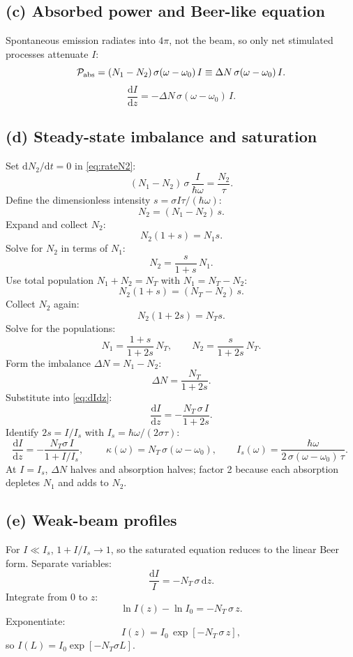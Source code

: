 \documentclass[11pt]{article}
\newcommand{\de}{\mathrm{d}}
\begin{document}
\subsection*{(c) Absorbed power and Beer-like equation}

Spontaneous emission radiates into $4\pi$, not the beam, so only net stimulated processes attenuate $I$:
\[
\mathcal P_{\rm abs} = (N_1-N_2)\,\sigma(\omega-\omega_0)\,I \equiv \Delta N\,\sigma(\omega-\omega_0)\,I.
\]
\begin{equation}
\boxed{\;\frac{\de I}{\de z} = -\Delta N\,\sigma(\omega-\omega_0)\,I.\;}
\label{eq:dIdz}
\end{equation}

\subsection*{(d) Steady-state imbalance and saturation}

Set $\de N_2/\de t=0$ in \eqref{eq:rateN2}:
\[
(N_1-N_2)\,\sigma\,\frac{I}{\hbar\omega} = \frac{N_2}{\tau}.
\]
Define the dimensionless intensity $s=\sigma I\tau/(\hbar\omega)$:
\[
N_2 = (N_1-N_2)\,s.
\]
Expand and collect $N_2$:
\[
N_2(1+s) = N_1 s.
\]
Solve for $N_2$ in terms of $N_1$:
\[
N_2 = \frac{s}{1+s}\,N_1.
\]
Use total population $N_1+N_2=N_T$ with $N_1 = N_T - N_2$:
\[
N_2(1+s) = (N_T-N_2)\,s.
\]
Collect $N_2$ again:
\[
N_2(1+2s) = N_T s.
\]
Solve for the populations:
\[
N_1 = \frac{1+s}{1+2s}\,N_T,\qquad N_2 = \frac{s}{1+2s}\,N_T.
\]
Form the imbalance $\Delta N = N_1-N_2$:
\[
\Delta N = \frac{N_T}{1+2s}.
\]
Substitute into \eqref{eq:dIdz}:
\[
\frac{\de I}{\de z} = -\frac{N_T\,\sigma\,I}{1+2s}.
\]
Identify $2s = I/I_s$ with $I_s = \hbar\omega/(2\sigma\tau)$:
\begin{equation}
\frac{\de I}{\de z} = -\frac{N_T\sigma\,I}{1+I/I_s},\qquad
\boxed{\;\kappa(\omega) = N_T\,\sigma(\omega-\omega_0),\qquad I_s(\omega) = \frac{\hbar\omega}{2\,\sigma(\omega-\omega_0)\,\tau}.\;}
\label{eq:kappaIs}
\end{equation}
At $I=I_s$, $\Delta N$ halves and absorption halves; factor 2 because each absorption depletes $N_1$ and adds to $N_2$.

\subsection*{(e) Weak-beam profiles}

For $I\ll I_s$, $1+I/I_s\to 1$, so the saturated equation reduces to the linear Beer form. Separate variables:
\[
\frac{\de I}{I} = -N_T\,\sigma\,\de z.
\]
Integrate from $0$ to $z$:
\[
\ln I(z) - \ln I_0 = -N_T\,\sigma\,z.
\]
Exponentiate:
\[
I(z) = I_0\,\exp[-N_T\,\sigma\,z],
\]
so $I(L)=I_0\exp[-N_T\sigma L]$.
\end{document}
